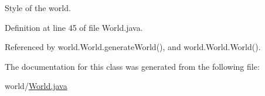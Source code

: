 Style of the world. 



Definition at line 45 of file World.\-java.



Referenced by world.\-World.\-generate\-World(), and world.\-World.\-World().



The documentation for this class was generated from the following file\-:\begin{DoxyCompactItemize}
\item 
world/\hyperlink{a00079}{World.\-java}\end{DoxyCompactItemize}
